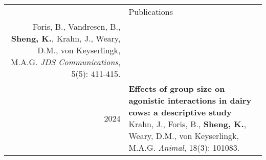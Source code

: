 \documentclass[letterpaper, 11pt]{article}
\newcommand{\headingfont}{\Large\color{OliveGreen}}
\newenvironment{SectionTable}[1]{
	\renewcommand*{\arraystretch}{1.7}
	\setlength{\tabcolsep}{10pt}
	\begin{longtable}{Rp{5.2in}} & #1 \\}
{\end{longtable}\vspace{-.3cm}}
\begin{document}
\begin{SectionTable}{\headingfont Publications}
Foris, B., Vandresen, B., \textbf{Sheng, K.}, Krahn, J., Weary, D.M., von Keyserlingk, M.A.G. \newline
\textit{JDS Communications}, 5(5): 411-415. \\
2024 & 
\textbf{{Effects of group size on agonistic interactions in dairy cows: a descriptive study}} \newline
Krahn, J., Foris, B., \textbf{Sheng, K.}, Weary, D.M., von Keyserlingk, M.A.G. \newline
\textit{Animal}, 18(3): 101083. 
\end{SectionTable}


\end{document}
